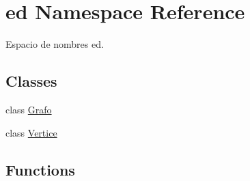 \hypertarget{namespaceed}{}\section{ed Namespace Reference}
\label{namespaceed}


Espacio de nombres ed.  


\subsection*{Classes}
\begin{DoxyCompactItemize}
\item 
class \hyperlink{classed_1_1Grafo}{Grafo}
\item 
class \hyperlink{classed_1_1Vertice}{Vertice}
\end{DoxyCompactItemize}
\subsection*{Functions}
